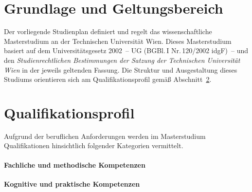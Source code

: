 
\newcommand*\Markierung{Master}
\newcommand*\Studienart{Masterstudium}
\newcommand*\ArtikelAkkusativStudienart{das}
\DECKBLATT

\tableofcontents
\clearpage

\section{Grundlage und Geltungsbereich}\label{sec:GG}

Der vorliegende Studienplan definiert und regelt das
{}wissenschaftliche
Masterstudium \emph{} an der Technischen Universität
Wien. Dieses Masterstudium basiert auf dem Universitätsgesetz 
2002~-- UG (BGBl.\,I Nr.\,120/2002 idgF)~-- und den 
\emph{Studienrechtlichen Bestimmungen der Satzung der Technischen 
Universität Wien} in der jeweils geltenden Fassung. 
Die Struktur und Ausgestaltung dieses Studiums orientieren
sich am Qualifikationsprofil gemäß Abschnitt~\ref{sec:QP}.

\section{Qualifikationsprofil}\label{sec:QP}

\newcommand*\QPIntro{%
  Das Masterstudium \emph{\VAR{Titel}} vermittelt eine vertiefte,
  wissenschaftlich und methodisch hochwertige, auf dauerhaftes Wissen
  ausgerichtete Bildung, welche die Absolvent\_innen 
  sowohl für eine Weiterqualifizierung vor allem im Rahmen eines
  facheinschlägigen Doktoratsstudiums als auch für eine Beschäftigung
  in beispielsweise folgenden Tätigkeitsbereichen befähigt und
  international konkurrenzfähig macht.%
}


%

Aufgrund der beruflichen Anforderungen werden im Masterstudium
\emph{} Qualifikationen hinsichtlich folgender Kategorien
vermittelt.

\paragraph{Fachliche und methodische Kompetenzen}

\paragraph{Kognitive und praktische Kompetenzen}

